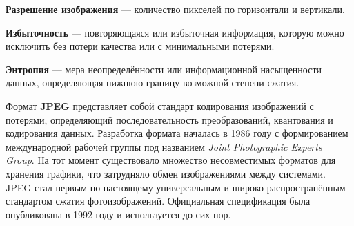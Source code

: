 \textbf{Разрешение изображения} — количество пикселей по горизонтали и вертикали.

\textbf{Избыточность} — повторяющаяся или избыточная информация, которую можно исключить без потери качества или с минимальными потерями.

\textbf{Энтропия} — мера неопределённости или информационной насыщенности данных, определяющая нижнюю границу возможной степени сжатия.

Формат \textbf{JPEG} представляет собой стандарт кодирования изображений с потерями, определяющий последовательность преобразований, квантования и кодирования данных. 
Разработка формата началась в 1986 году с формированием международной рабочей группы под названием \emph{Joint Photographic Experts Group}. 
На тот момент существовало множество несовместимых форматов для хранения графики, что затрудняло обмен изображениями между системами. 
JPEG стал первым по-настоящему универсальным и широко распространённым стандартом сжатия фотоизображений. 
Официальная спецификация была опубликована в 1992 году и используется до сих пор.